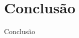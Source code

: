

\section{Conclusão}
    \label{sec:conclusao}
    
    \begin{frame}{Conclusão}
        
    \end{frame}
